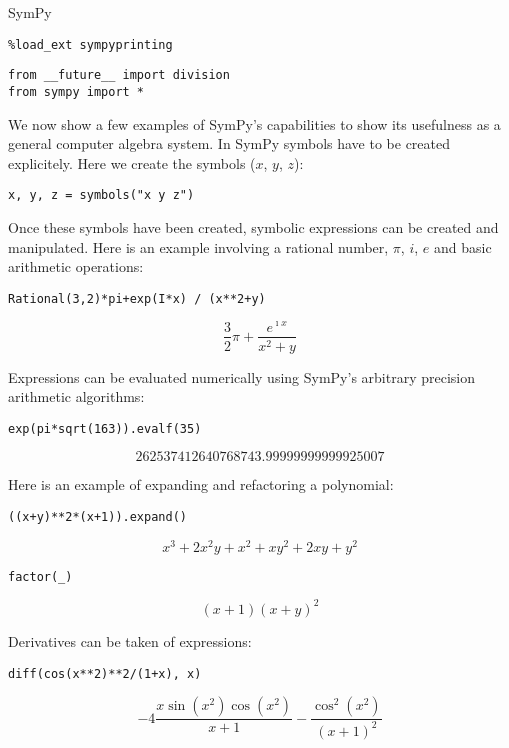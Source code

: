 SymPy

\begin{verbatim}
%load_ext sympyprinting
\end{verbatim}

\begin{verbatim}
from __future__ import division
from sympy import *
\end{verbatim}

We now show a few examples of SymPy's capabilities to show its usefulness as a
general computer algebra system. In SymPy symbols have to be created
explicitely. Here we create the symbols ($x$, $y$, $z$):

\begin{verbatim}
x, y, z = symbols("x y z")
\end{verbatim}

Once these symbols have been created, symbolic expressions can be created and
manipulated. Here is an example involving a rational number, $\pi$, $i$, $e$ and
basic arithmetic operations:

\begin{verbatim}
Rational(3,2)*pi+exp(I*x) / (x**2+y)
\end{verbatim}
$$\frac{3}{2} \pi + \frac{e^{\mathbf{\imath} x}}{x^{2} + y}$$

Expressions can be evaluated numerically using SymPy's arbitrary precision
arithmetic algorithms:

\begin{verbatim}
exp(pi*sqrt(163)).evalf(35)
\end{verbatim}
$$262537412640768743.99999999999925007$$

Here is an example of expanding and refactoring a polynomial:

\begin{verbatim}
((x+y)**2*(x+1)).expand()
\end{verbatim}
$$x^{3} + 2 x^{2} y + x^{2} + x y^{2} + 2 x y + y^{2}$$

\begin{verbatim}
factor(_)
\end{verbatim}
$$\left(x + 1\right) \left(x + y\right)^{2}$$

Derivatives can be taken of expressions:

\begin{verbatim}
diff(cos(x**2)**2/(1+x), x)
\end{verbatim}
$$- 4 \frac{x \operatorname{sin}\left(x^{2}\right) \operatorname{cos}\left(x^{2}\right)}{x + 1} - \frac{\operatorname{cos}^{2}\left(x^{2}\right)}{\left(x + 1\right)^{2}}$$

